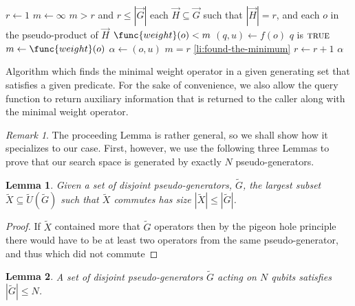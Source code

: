 \documentclass[12pt]{amsbook}
\theoremstyle{plain}
\newtheorem{lemma}{Lemma}
\theoremstyle{definition}
\theoremstyle{remark}
\newtheorem{remark}{Remark}
\newcommand{\lst}{\vec}
\newcommand{\set}{\tilde}
\begin{document}
\begin{table}
\begin{codebox}
\Procname{$\proc{Find-Weight-Minimizer}(f,\lst G)$}
\li $r \gets 1$
\li $m \gets \infty$
\li \While $m > r$ and $r \le |\lst G|$
\li \Do
\li     \For each $\lst H\subseteq \lst G$ such that $|\lst H|=r$,
\li     and each $o$ in the pseudo-product of $\lst H$
\li     \Do
\li         \If $\func{weight}(o) < m$
\li         \Then
\li             $(q,u) \gets f(o)$
\li             \If $q$ is $\textsc{true}$
\li             \Then
\li                 $m \gets \func{weight}(o)$
\li                 $\alpha \gets (o,u)$
\li                 \If $m = r$
\li                 \Then
\li                     \Goto \ref{li:found-the-minimum}
                    \End
                \End
            \End
        \End
\li     $r \gets r + 1$
    \End
\li \Return $\alpha$ \label{li:found-the-minimum}
\end{codebox}
\caption[Algorithm ]{Algorithm which finds the minimal weight operator in a given generating set that satisfies a given predicate.  For the sake of convenience, we also allow the query function to return auxiliary information that is returned to the caller along with the minimal weight operator.} \label{table:find-weight-minimizer}
\end{table}
\begin{remark}
The proceeding Lemma is rather general, so we shall show how it specializes to our case.  First, however, we use the following three Lemmas to prove that our search space is generated by exactly $N$ pseudo-generators.
\end{remark}

\begin{lemma}
\label{lemma:lower bound on number of disjoint pseudo-generators}
Given a set of disjoint pseudo-generators, $\set G$, the largest subset $\set X\subseteq\set U(\set G)$ such that $\set X$ commutes has size $|\set X|\le|\set G|$.
\end{lemma}

\begin{proof}
If $\set X$ contained more that $\set G$ operators then by the pigeon hole principle there would have to be at least two operators from the same pseudo-generator, and thus which did not commute
\end{proof}

\begin{lemma}
\label{lemma:upper bound on number of disjoint pseudo-generators}
A set of disjoint pseudo-generators $\set G$ acting on $N$ qubits satisfies $|\set G|\le N$.
\end{lemma}
\end{document}
